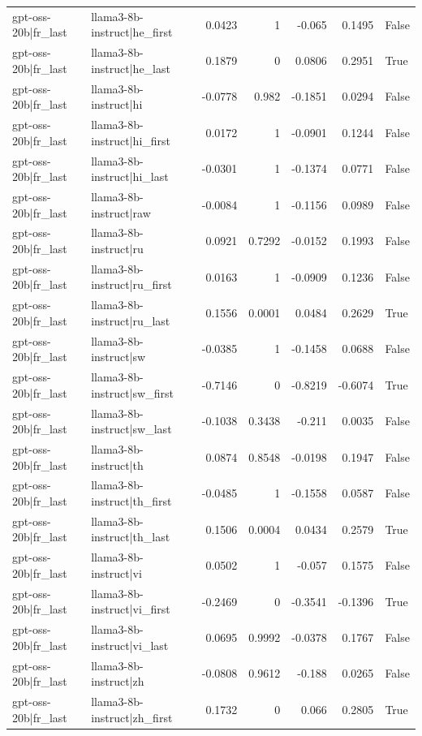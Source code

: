 \begin{table}
\begin{tabular}{l l r r r r l}
gpt-oss-20b|fr_last & llama3-8b-instruct|he_first & 0.0423 & 1 & -0.065 & 0.1495 & False \\
gpt-oss-20b|fr_last & llama3-8b-instruct|he_last & 0.1879 & 0 & 0.0806 & 0.2951 & True \\
gpt-oss-20b|fr_last & llama3-8b-instruct|hi & -0.0778 & 0.982 & -0.1851 & 0.0294 & False \\
gpt-oss-20b|fr_last & llama3-8b-instruct|hi_first & 0.0172 & 1 & -0.0901 & 0.1244 & False \\
gpt-oss-20b|fr_last & llama3-8b-instruct|hi_last & -0.0301 & 1 & -0.1374 & 0.0771 & False \\
gpt-oss-20b|fr_last & llama3-8b-instruct|raw & -0.0084 & 1 & -0.1156 & 0.0989 & False \\
gpt-oss-20b|fr_last & llama3-8b-instruct|ru & 0.0921 & 0.7292 & -0.0152 & 0.1993 & False \\
gpt-oss-20b|fr_last & llama3-8b-instruct|ru_first & 0.0163 & 1 & -0.0909 & 0.1236 & False \\
gpt-oss-20b|fr_last & llama3-8b-instruct|ru_last & 0.1556 & 0.0001 & 0.0484 & 0.2629 & True \\
gpt-oss-20b|fr_last & llama3-8b-instruct|sw & -0.0385 & 1 & -0.1458 & 0.0688 & False \\
gpt-oss-20b|fr_last & llama3-8b-instruct|sw_first & -0.7146 & 0 & -0.8219 & -0.6074 & True \\
gpt-oss-20b|fr_last & llama3-8b-instruct|sw_last & -0.1038 & 0.3438 & -0.211 & 0.0035 & False \\
gpt-oss-20b|fr_last & llama3-8b-instruct|th & 0.0874 & 0.8548 & -0.0198 & 0.1947 & False \\
gpt-oss-20b|fr_last & llama3-8b-instruct|th_first & -0.0485 & 1 & -0.1558 & 0.0587 & False \\
gpt-oss-20b|fr_last & llama3-8b-instruct|th_last & 0.1506 & 0.0004 & 0.0434 & 0.2579 & True \\
gpt-oss-20b|fr_last & llama3-8b-instruct|vi & 0.0502 & 1 & -0.057 & 0.1575 & False \\
gpt-oss-20b|fr_last & llama3-8b-instruct|vi_first & -0.2469 & 0 & -0.3541 & -0.1396 & True \\
gpt-oss-20b|fr_last & llama3-8b-instruct|vi_last & 0.0695 & 0.9992 & -0.0378 & 0.1767 & False \\
gpt-oss-20b|fr_last & llama3-8b-instruct|zh & -0.0808 & 0.9612 & -0.188 & 0.0265 & False \\
gpt-oss-20b|fr_last & llama3-8b-instruct|zh_first & 0.1732 & 0 & 0.066 & 0.2805 & True \\

\end{tabular}
\end{table}
